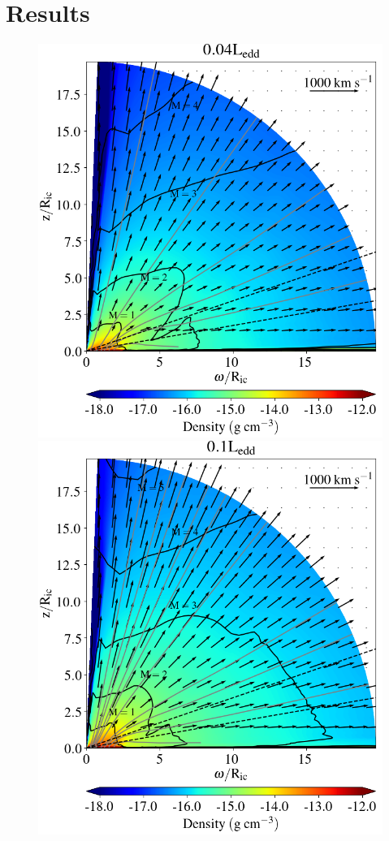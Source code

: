 \documentclass[a4paper,fleqn,usenatbib]{mnras}
\begin{document}
\section{Results}
\label{section:results}

\begin{figure}
\includegraphics[width=\columnwidth]{figures/fig3a_density.png}
\includegraphics[width=\columnwidth]{figures/fig3b_density.png}

\end{figure}
\end{document}
